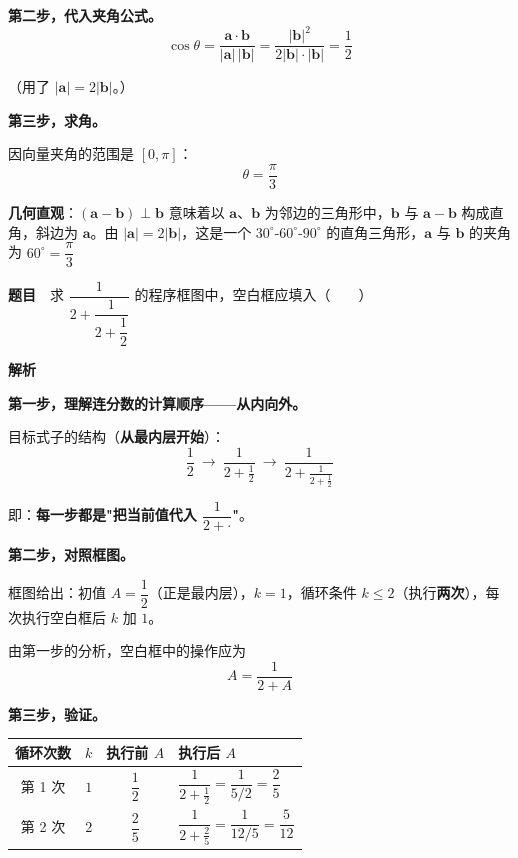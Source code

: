 \textbf{第二步，代入夹角公式。}
\[\cos\theta=\frac{\boldsymbol a\cdot\boldsymbol b}{|\boldsymbol a|\,|\boldsymbol b|}=\frac{|\boldsymbol b|^{2}}{2|\boldsymbol b|\cdot|\boldsymbol b|}=\frac12\]

（用了 $|\boldsymbol a|=2|\boldsymbol b|$。）

\textbf{第三步，求角。}

因向量夹角的范围是 $[0,\pi]$：
\[\theta=\frac\pi3\]


\begin{gktip}
\textbf{几何直观}：$(\boldsymbol a-\boldsymbol b)\perp\boldsymbol b$ 意味着以 $\boldsymbol a$、$\boldsymbol b$ 为邻边的三角形中，$\boldsymbol b$ 与 $\boldsymbol a-\boldsymbol b$ 构成直角，斜边为 $\boldsymbol a$。由 $|\boldsymbol a|=2|\boldsymbol b|$，这是一个 $30^\circ$-$60^\circ$-$90^\circ$ 的直角三角形，$\boldsymbol a$ 与 $\boldsymbol b$ 的夹角为 $60^\circ=\dfrac\pi3$ 
\end{gktip}

\par\medskip


\textbf{题目}　求 $\dfrac1{2+\dfrac1{2+\dfrac12}}$ 的程序框图中，空白框应填入（　　）

\begin{center}\end{center}

\textbf{解析}

\textbf{第一步，理解连分数的计算顺序——从内向外。}

目标式子的结构（\textbf{从最内层开始}）：
\[\frac12\ \longrightarrow\ \frac1{2+\frac12}\ \longrightarrow\ \frac1{2+\frac1{2+\frac12}}\]

即：\textbf{每一步都是"把当前值代入 $\dfrac1{2+\cdot}$"}。

\textbf{第二步，对照框图。}

框图给出：初值 $A=\dfrac12$（正是最内层），$k=1$，循环条件 $k\le2$（执行\textbf{两次}），每次执行空白框后 $k$ 加 $1$。

由第一步的分析，空白框中的操作应为
\[A=\frac1{2+A}\]

\textbf{第三步，验证。}

\begin{center}
\begin{tabular}{cccl}
\toprule
循环次数 & $k$ & 执行前 $A$ & 执行后 $A$ \\
\midrule
第 1 次 & $1$ & $\dfrac12$ & $\dfrac1{2+\frac12}=\dfrac1{5/2}=\dfrac25$ \\
第 2 次 & $2$ & $\dfrac25$ & $\dfrac1{2+\frac25}=\dfrac1{12/5}=\dfrac5{12}$ \\
\bottomrule
\end{tabular}
\end{center}

